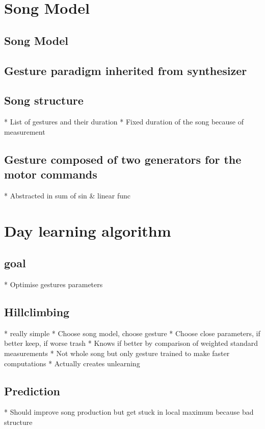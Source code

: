 \documentclass{report}
\begin{document}
\section{Song Model}\label{song-model}

\subsection{Song Model}\label{song-model-1}

\subsection{Gesture paradigm inherited from
synthesizer}\label{gesture-paradigm-inherited-from-synthesizer}

\subsection{Song structure}\label{song-structure}

  * List of gestures and their duration
  * Fixed duration of the song because of measurement
\subsection{Gesture composed of two generators for the motor
commands}\label{gesture-composed-of-two-generators-for-the-motor-commands}

  * Abstracted in sum of sin \& linear func
\section{Day learning algorithm}\label{day-learning-algorithm}

\subsection{goal}\label{goal}
  * Optimise gestures parameters
\subsection{Hillclimbing}\label{hillclimbing}

  * really simple
  * Choose song model, choose gesture
  * Choose close parameters, if better keep, if worse trash
  * Knows if better by comparison of weighted standard measurements
  * Not whole song but only gesture trained to make faster computations
        * Actually creates unlearning

  \subsection{Prediction}\label{prediction}
  * Should improve song production but get stuck in local maximum because
  bad structure
\end{document}
